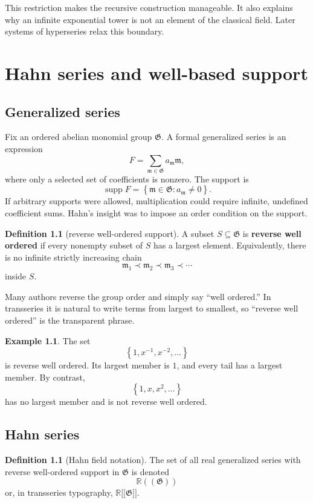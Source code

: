 \documentclass[11pt,openany]{book}
\theoremstyle{plain}
\theoremstyle{definition}
\newtheorem{definition}[theorem]{Definition}
\newtheorem{example}[theorem]{Example}
\theoremstyle{remark}
\newcommand{\R}{\mathbb{R}}
\newcommand{\G}{\mathfrak{G}}
\newcommand{\m}{\mathfrak{m}}
\newcommand{\supp}{\operatorname{supp}}
\newcommand{\set}[1]{\left\{#1\right\}}
\newcommand{\defterm}[1]{\textbf{#1}}
\newcommand{\llbracket}{\mathopen{[\![}}
\newcommand{\rrbracket}{\mathclose{]\!]}}
\begin{document}
This restriction makes the recursive construction manageable. It also explains why an infinite exponential tower is not an element of the classical field. Later systems of hyperseries relax this boundary.

\chapter{Hahn series and well-based support}
\label{chap:hahn}

\section{Generalized series}
Fix an ordered abelian monomial group $\G$. A formal generalized series is an expression
\[
  F=\sum_{\m\in\G}a_{\m}\m,
\]
where only a selected set of coefficients is nonzero. The support is
\[
  \supp F=\set{\m\in\G:a_{\m}\ne0}.
\]
If arbitrary supports were allowed, multiplication could require infinite, undefined coefficient sums. Hahn's insight was to impose an order condition on the support.

\begin{definition}[reverse well-ordered support]
A subset $S\subseteq\G$ is \defterm{reverse well ordered} if every nonempty subset of $S$ has a largest element. Equivalently, there is no infinite strictly increasing chain
\[
  \m_1\prec\m_2\prec\m_3\prec\cdots
\]
inside $S$.
\end{definition}

Many authors reverse the group order and simply say ``well ordered.'' In transseries it is natural to write terms from largest to smallest, so ``reverse well ordered'' is the transparent phrase.

\begin{example}
The set
\[
  \set{1,x^{-1},x^{-2},\ldots}
\]
is reverse well ordered. Its largest member is $1$, and every tail has a largest member. By contrast,
\[
  \set{1,x,x^2,\ldots}
\]
has no largest member and is not reverse well ordered.
\end{example}

\section{Hahn series}
\begin{definition}[Hahn field notation]
The set of all real generalized series with reverse well-ordered support in $\G$ is denoted
\[
  \R((\G))
\]
or, in transseries typography, $\R\llbracket\G\rrbracket$.
\end{definition}
\end{document}
